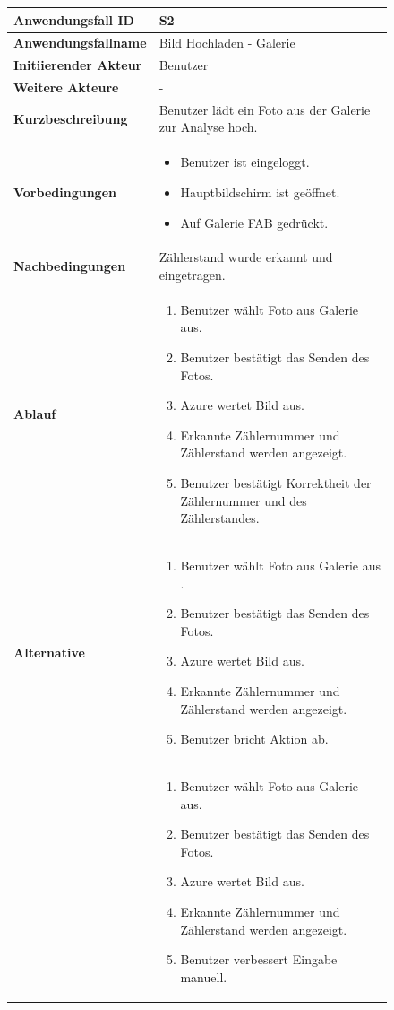\begin{figure}[H]
	\centering
	\begin{tabularx}{\textwidth}{ X | X }
		\textbf{Anwendungsfall ID} & S2 \\ \hline
		\textbf{Anwendungsfallname} & Bild Hochladen - Galerie \\ \hline
		\textbf{Initiierender Akteur} & Benutzer \\ \hline
		\textbf{Weitere Akteure} & - \\ \hline
		\textbf{Kurzbeschreibung} & Benutzer lädt ein Foto aus der Galerie zur Analyse hoch. \\ \hline
		\textbf{Vorbedingungen} &
		\begin {itemize}
			\item Benutzer ist eingeloggt.
			\item Hauptbildschirm ist geöffnet.
			\item Auf Galerie FAB gedrückt.
		\end{itemize}\\ \hline
		\textbf{Nachbedingungen} & Zählerstand wurde erkannt und eingetragen. \\ \hline
		\textbf{Ablauf} &
		\begin{enumerate}
			\item Benutzer wählt Foto aus Galerie aus.
			\item Benutzer bestätigt das Senden des Fotos. 
			\item Azure wertet Bild aus.
			\item Erkannte Zählernummer und Zählerstand werden angezeigt. 
			\item Benutzer bestätigt Korrektheit der Zählernummer und des Zählerstandes.
		\end{enumerate} \\ \hline
		\textbf{Alternative} & 
		\begin{enumerate}
			\item Benutzer wählt Foto aus Galerie aus .
			\item Benutzer bestätigt das Senden des Fotos.
			\item Azure wertet Bild aus. 
			\item Erkannte Zählernummer und Zählerstand werden angezeigt. 
			\item Benutzer bricht Aktion ab. 
		\end{enumerate}
		\\&
		\begin{enumerate}
			\item Benutzer wählt Foto aus Galerie aus.
			\item Benutzer bestätigt das Senden des Fotos. 
			\item Azure wertet Bild aus.
			\item Erkannte Zählernummer und Zählerstand werden angezeigt. 
			\item Benutzer verbessert Eingabe manuell.
		\end{enumerate} \\
	\end{tabularx}
\end{figure}
